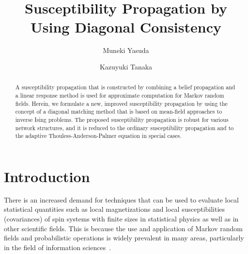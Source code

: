 \documentclass[%
 reprint,
 amsmath,amssymb,
 aps, 
 pre,
 showkeys
]{revtex4-1}
\begin{document}

\title{Susceptibility Propagation by Using Diagonal Consistency}%

\author{Muneki Yasuda}  
%
\author{Kazuyuki Tanaka}%
%



\begin{abstract}
A susceptibility propagation that is constructed by combining a belief propagation and a linear response method is used for approximate computation for Markov random fields. 
Herein, we formulate a new, improved susceptibility propagation by using the concept of a diagonal matching method that is based on mean-field approaches to inverse Ising problems. 
The proposed susceptibility propagation is robust for various network structures, 
and it is reduced to the ordinary susceptibility propagation and to the adaptive Thouless-Anderson-Palmer equation in special cases.
\end{abstract}

\maketitle


\section{Introduction} \label{sec:intro}


There is an increased demand for techniques that can be used to evaluate local statistical quantities such as local magnetizations and local susceptibilities (covariances) 
of spin systems with finite sizes in statistical physics as well as in other scientific fields. 
This is because the use and application of Markov random fields and probabilistic operations is widely prevalent in many areas, 
particularly in the field of information sciences~\cite{Opper&Saad2001, Mezard&Montanari2009}.
\end{document}

